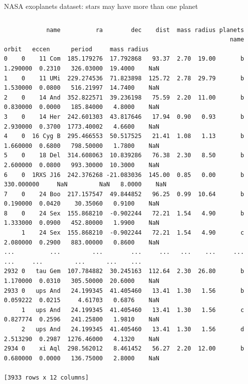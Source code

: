 \documentclass[aspectratio=169]{beamer}
\begin{document}
\begin{frame}[fragile]{NASA exoplanets dataset: stars may have more than one planet}
\begin{columns}
\begin{onlyenv}
\tiny
\vspace{-0.6 cm}
\begin{verbatim}
            name          ra        dec    dist  mass radius planets                                               
                                                                name      orbit   eccen      period     mass radius
0    0    11 Com  185.179276  17.792868   93.37  2.70  19.00       b   1.290000  0.2310   326.03000  19.4000    NaN
1    0    11 UMi  229.274536  71.823898  125.72  2.78  29.79       b   1.530000  0.0800   516.21997  14.7400    NaN
2    0    14 And  352.822571  39.236198   75.59  2.20  11.00       b   0.830000  0.0000   185.84000   4.8000    NaN
3    0    14 Her  242.601303  43.817646   17.94  0.90   0.93       b   2.930000  0.3700  1773.40002   4.6600    NaN
4    0  16 Cyg B  295.466553  50.517525   21.41  1.08   1.13       b   1.660000  0.6800   798.50000   1.7800    NaN
5    0    18 Del  314.608063  10.839286   76.38  2.30   8.50       b   2.600000  0.0800   993.30000  10.3000    NaN
6    0  1RXS J16  242.376268 -21.083036  145.00  0.85   0.00       b 330.000000     NaN         NaN   8.0000    NaN
7    0    24 Boo  217.157547  49.844852   96.25  0.99  10.64       b   0.190000  0.0420    30.35060   0.9100    NaN
8    0    24 Sex  155.868210  -0.902244   72.21  1.54   4.90       b   1.333000  0.0900   452.80000   1.9900    NaN
     1    24 Sex  155.868210  -0.902244   72.21  1.54   4.90       c   2.080000  0.2900   883.00000   0.8600    NaN
...          ...         ...        ...     ...   ...    ...     ...        ...     ...         ...      ...    ...
2932 0   tau Gem  107.784882  30.245163  112.64  2.30  26.80       b   1.170000  0.0310   305.50000  20.6000    NaN
2933 0   ups And   24.199345  41.405460   13.41  1.30   1.56       b   0.059222  0.0215     4.61703   0.6876    NaN
     1   ups And   24.199345  41.405460   13.41  1.30   1.56       c   0.827774  0.2596   241.25800   1.9810    NaN
     2   ups And   24.199345  41.405460   13.41  1.30   1.56       d   2.513290  0.2987  1276.46000   4.1320    NaN
2934 0    xi Aql  298.562012   8.461452   56.27  2.20  12.00       b   0.680000  0.0000   136.75000   2.8000    NaN

[3933 rows x 12 columns]
\end{verbatim}

\vspace{10 cm}
\end{onlyenv}
\end{columns}
\end{frame}
\end{document}

